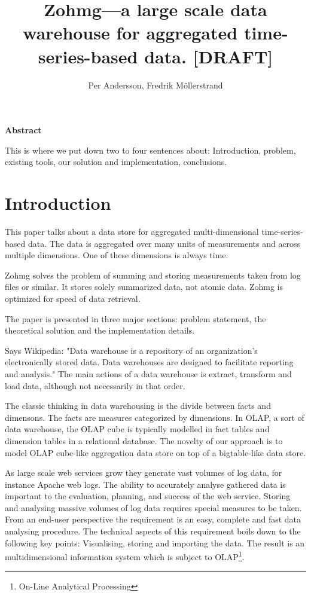 \documentclass[a4paper,10pt]{book}
\author{Per Andersson, Fredrik M{\"o}llerstrand}
\title{Zohmg---a large scale data warehouse for aggregated time-series-based
data. [DRAFT]}
\begin{document}
\maketitle



\noindent \Large{\textbf{Abstract}}

\vspace{12pt}

\noindent This is where we put down two to four sentences about:
Introduction, problem, existing tools, our solution and implementation,
conclusions.


\tableofcontents

\vfill

\pagebreak



\chapter{Introduction}

This paper talks about a data store for aggregated multi-dimensional time-series-based data. The data is aggregated over many units of measurements and across multiple dimensions. One of these dimensions is always time.

Zohmg solves the problem of summing and storing measurements taken from log files or similar. It stores solely summarized data, not atomic data. Zohmg is optimized for speed of data retrieval.

The paper is presented in three major sections: problem statement, the theoretical solution and the implementation details.

Says Wikipedia: "Data warehouse is a repository of an organization's electronically stored data. Data warehouses are designed to facilitate reporting and analysis." The main actions of a data warehouse is extract, transform and load data, although not necessarily in that order.

The classic thinking in data warehousing is the divide between facts and dimensons. The facts are measures categorized by dimensions. In OLAP, a sort of data warehouse, the OLAP cube is typically modelled in fact tables and dimension tables in a relational database. The novelty of our approach is to model OLAP cube-like aggregation data store on top of a bigtable-like data store.


As large scale web services grow they generate vast volumes of log data,
for instance Apache web logs. The ability to accurately analyse gathered
data is important to the evaluation, planning, and success of the web
service. Storing and analysing massive volumes of log data requires
special measures to be taken. From an end-user perspective the requirement
is an easy, complete and fast data analysing procedure. The technical
aspects of this requirement boils down to the following key points:
Visualising, storing and importing the data. The result is an
multidimensional information system which is subject to
OLAP\footnote{On-Line Analytical Processing}. \cite{olap_solutions}
\end{document}
